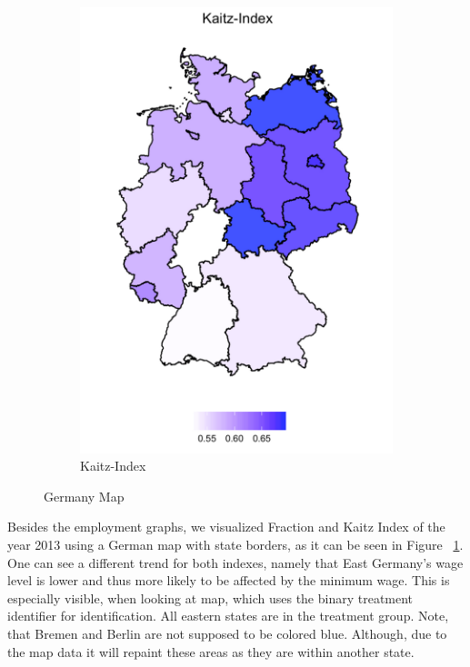 \documentclass[a4paper]{article}
\begin{document}
{\begin{figure}
\begin{subfigure}[h]{0.33\linewidth}
\includegraphics[width=\textwidth]{q6/plot-kaitz.pdf}
\caption{Kaitz-Index}
\end{subfigure}%
\caption{Germany Map}
\label{q6map}
\end{figure}
%
%
Besides the employment graphs, we visualized Fraction and Kaitz Index of the year 2013 using a German map with state borders, as it can be seen in Figure ~\ref{q6map}. One can see a different trend for both indexes, namely that East Germany's wage level is lower and thus more likely to be affected by the minimum wage. This is especially visible, when looking at map, which uses the binary treatment identifier for identification. All eastern states are in the treatment group. Note, that Bremen and Berlin are not supposed to be colored blue. Although, due to the map data it will repaint these areas as they are within another state. 
%
\begin{lstlisting}
\end{lstlisting}
%
%
}
\end{document}
